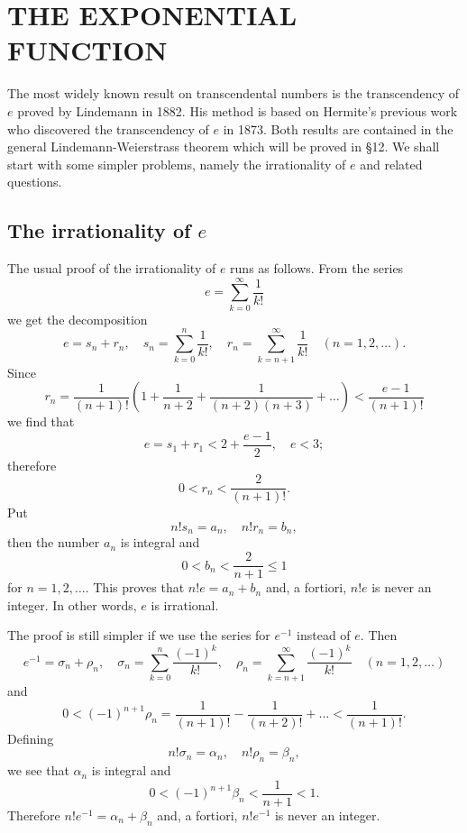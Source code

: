\chapter{THE EXPONENTIAL FUNCTION}

The most widely known result on transcendental numbers is the transcendency of $e$ proved by Lindemann in 1882. His method is based on Hermite's previous work who discovered the transcendency of $e$ in 1873. Both results are contained in the general Lindemann-Weierstrass theorem which will be proved in \S 12. We shall start with some simpler problems, namely the irrationality of $e$ and related questions.

\section{The irrationality of $e$}

The usual proof of the irrationality of $e$ runs as follows. From the series
\[ e = \sum_{k=0}^{\infty} \frac{1}{k!} \]
we get the decomposition
\[ e = s_n + r_n, \quad s_n = \sum_{k=0}^{n} \frac{1}{k!}, \quad r_n = \sum_{k=n+1}^{\infty} \frac{1}{k!} \quad (n=1, 2, \dots). \]
Since
\[ r_n = \frac{1}{(n+1)!} \left( 1 + \frac{1}{n+2} + \frac{1}{(n+2)(n+3)} + \dots \right) < \frac{e-1}{(n+1)!} \]
we find that
\[ e = s_1 + r_1 < 2 + \frac{e-1}{2}, \quad e < 3; \]
therefore
\[ 0 < r_n < \frac{2}{(n+1)!}. \]
Put
\[ n! s_n = a_n, \quad n! r_n = b_n, \]
then the number $a_n$ is integral and
\[ 0 < b_n < \frac{2}{n+1} \le 1 \]
for $n=1, 2, \dots$. This proves that $n! e = a_n + b_n$ and, a fortiori, $n! e$ is never an integer. In other words, $e$ is irrational.

The proof is still simpler if we use the series for $e^{-1}$ instead of $e$. Then
\[ e^{-1} = \sigma_n + \rho_n, \quad \sigma_n = \sum_{k=0}^{n} \frac{(-1)^k}{k!}, \quad \rho_n = \sum_{k=n+1}^{\infty} \frac{(-1)^k}{k!} \quad (n=1, 2, \dots) \]
and
\[ 0 < (-1)^{n+1} \rho_n = \frac{1}{(n+1)!} - \frac{1}{(n+2)!} + \dots < \frac{1}{(n+1)!}. \]
Defining
\[ n! \sigma_n = \alpha_n, \quad n! \rho_n = \beta_n, \]
we see that $\alpha_n$ is integral and
\[ 0 < (-1)^{n+1} \beta_n < \frac{1}{n+1} < 1. \]
Therefore $n! e^{-1} = \alpha_n + \beta_n$ and, a fortiori, $n! e^{-1}$ is never an integer.

